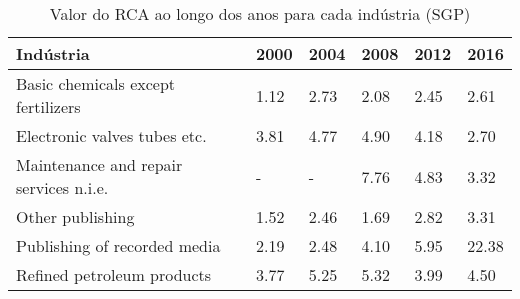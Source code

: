 \begin{table}
\centering
\caption{Valor do RCA ao longo dos anos para cada indústria (SGP)}
\label{tab:ex3-tempo-SGP}
\begin{tabular}{p{6cm}p{1.5cm}p{1.5cm}p{1.5cm}p{1.5cm}p{1.5cm}}
\toprule
                             Indústria & 2000 & 2004 & 2008 & 2012 &  2016 \\
\midrule
    Basic chemicals except fertilizers & 1.12 & 2.73 & 2.08 & 2.45 &  2.61 \\
          Electronic valves tubes etc. & 3.81 & 4.77 & 4.90 & 4.18 &  2.70 \\
Maintenance and repair services n.i.e. &    - &    - & 7.76 & 4.83 &  3.32 \\
                      Other publishing & 1.52 & 2.46 & 1.69 & 2.82 &  3.31 \\
          Publishing of recorded media & 2.19 & 2.48 & 4.10 & 5.95 & 22.38 \\
            Refined petroleum products & 3.77 & 5.25 & 5.32 & 3.99 &  4.50 \\
\bottomrule
\end{tabular}
\end{table}
